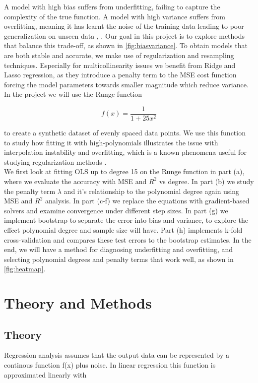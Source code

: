 \documentclass[amssymb,twocolumn,aps]{revtex4}
\begin{document}
A model with high bias suffers from underfitting, failing to capture the complexity of the true function. A model with high variance suffers from overfitting, meaning it has learnt the noise of the training data leading to poor generalization on unseen data \cite{compfys38}, \cite{hastie}. Our goal in this project is to explore methods that balance this trade-off, as shown in \ref{fig:biasvariance}. To obtain models that are both stable and accurate, we make use of regularization and resampling techniques. Especially for multicollinearity issues we benefit from Ridge and Lasso regression, as they introduce a penalty term to the MSE cost function forcing the model parameters towards smaller magnitude which reduce variance. \\

In the project we will use the Runge function

\begin{equation}
    f(x) = \frac{1}{1 + 25x^2}
\end{equation}

to create a synthetic dataset of evenly spaced data points. We use this function to study how fitting it with high-polynomials illustrates the issue with interpolation instability and overfitting, which is a known phenomena useful for studying regularization methods \cite{wikipedia-runge}. \\

We first look at fitting OLS up to degree 15 on the Runge function in part (a), where we evaluate the accuracy with MSE and $R^2$ vs degree. In part (b) we study the penalty term $\lambda$ and it's relationship to the polynomial degree again using MSE and $R^2$ analysis. In part (c-f) we replace the equations with gradient-based solvers and examine convergence under different step sizes. In part (g) we implement bootstrap to separate the error into bias and variance, to explore the effect polynomial degree and sample size will have. Part (h) implements k-fold cross-validation and compares these test errors to the bootstrap estimates. In the end, we will have a method for diagnosing underfitting and overfitting, and selecting polynomial degrees and penalty terms that work well, as shown in \ref{fig:heatmap}. 

\section{Theory and Methods}

\subsection{Theory}
\label{subsection:theory}
Regression analysis assumes that the output data can be represented by a continous function f(x) plus noise. In linear regression this function is approximated linearly with 
\end{document}
